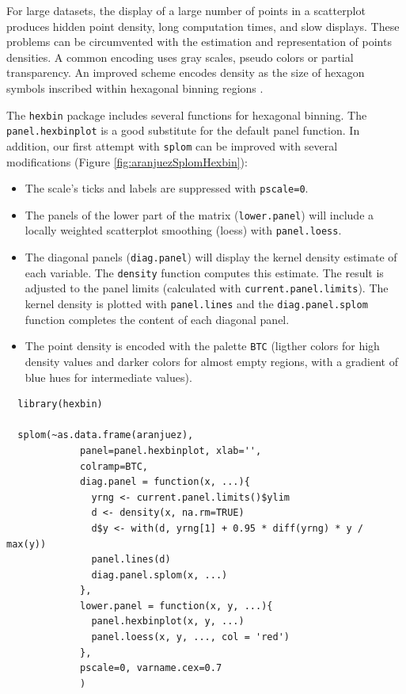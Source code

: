 \documentclass[smallroyalvopaper]{memoir}
\begin{document}
For large datasets, the display of a large number of points in a
scatterplot produces hidden point density, long computation times,
and slow displays. These problems can be circumvented with the
estimation and representation of points densities.  A common
encoding uses gray scales, pseudo colors or partial
transparency. An improved scheme encodes density as the size of
hexagon symbols inscribed within hexagonal binning regions
\cite{Carr.Littlefield.ea1987}.

The \texttt{hexbin} package \cite{Carr.Lewin-Koh.ea2013} includes several
functions for hexagonal binning.  The \texttt{panel.hexbinplot} is a good
substitute for the default panel function. In addition, our first
attempt with \texttt{splom} can be improved with several modifications
(Figure \ref{fig:aranjuezSplomHexbin}):
\begin{itemize}
\item The scale's ticks and labels are suppressed with \texttt{pscale=0}.
\item The panels of the lower part of the matrix (\texttt{lower.panel}) will
include a locally weighted scatterplot smoothing (loess) with
\texttt{panel.loess}.
\item The diagonal panels (\texttt{diag.panel}) will display the kernel
density estimate of each variable. The \texttt{density} function
computes this estimate. The result is adjusted to the panel
limits (calculated with \texttt{current.panel.limits}). The kernel
density is plotted with \texttt{panel.lines} and the \texttt{diag.panel.splom}
function completes the content of each diagonal panel.
\item The point density is encoded with the palette \texttt{BTC} (ligther
colors for high density values and darker colors for almost
empty regions, with a gradient of blue hues for intermediate values).
\end{itemize}


\lstset{language=r,label= ,caption= ,captionpos=b,numbers=none}
\begin{lstlisting}
  library(hexbin)
  
  splom(~as.data.frame(aranjuez),
             panel=panel.hexbinplot, xlab='',
             colramp=BTC,
             diag.panel = function(x, ...){
               yrng <- current.panel.limits()$ylim
               d <- density(x, na.rm=TRUE)
               d$y <- with(d, yrng[1] + 0.95 * diff(yrng) * y / max(y))
               panel.lines(d)
               diag.panel.splom(x, ...)
             },
             lower.panel = function(x, y, ...){
               panel.hexbinplot(x, y, ...)
               panel.loess(x, y, ..., col = 'red')
             },
             pscale=0, varname.cex=0.7
             )
  
\end{lstlisting}
\end{document}
